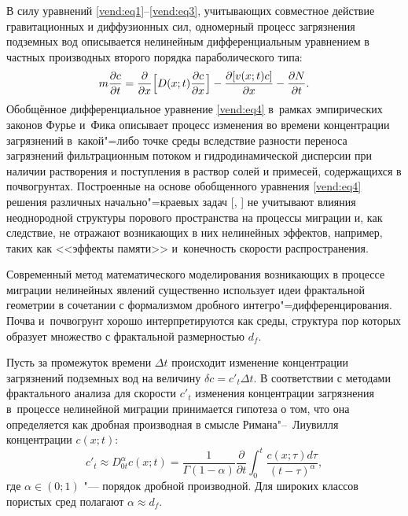 В силу уравнений \eqref{vend:eq1}--\eqref{vend:eq3}, учитывающих совместное действие гравитационных и диффузионных сил,  одномерный процесс загрязнения подземных вод
описывается нелинейным дифференциальным уравнением в частных производных 
второго порядка параболического типа:
\begin{equation}
\label{vend:eq4}
m\frac{\partial c}{\partial t}=\frac{\partial}{\partial x}\Bigl[D(x;t)\frac{\partial c}{\partial x}\Bigr]-\frac{\partial[v(x;t)c]}{\partial x}-\frac{\partial N}{\partial t}.
\end{equation}
Обобщённое дифференциальное уравнение \eqref{vend:eq4} в~рамках   эмпирических законов Фурье и~Фика описывает процесс изменения во времени  концентрации загрязнений в~какой"=либо точке среды вследствие разности 
переноса загрязнений фильтрационным потоком и гидродинамической дисперсии 
при наличии растворения и поступления в раствор солей и примесей, 
содержащихся в почвогрунтах. Построенные на основе обобщенного уравнения 
\eqref{vend:eq4} решения различных начально"=краевых задач [, ] не учитывают влияния 
неоднородной структуры порового пространства на процессы миграции и, как 
следствие, не отражают возникающих в них нелинейных эффектов, например, таких 
как <<эффекты памяти>> и~конечность скорости распространения.

Современный метод математического моделирования возникающих в процессе миграции 
нелинейных явлений существенно 
использует идеи фрактальной геометрии в сочетании с формализмом дробного 
интегро"=диф\-фе\-рен\-ци\-ро\-ва\-ния. Почва и~почвогрунт хорошо интерпретируются как среды, структура пор 
которых образует множество с фрактальной размерностью $d_f$. 

Пусть за промежуток времени $\Delta t$ происходит изменение концентрации 
загрязнений подземных вод на величину 
$\delta c = {c}'_t \Delta t$.
В соответствии с методами фрактального анализа \cite{ven:bib:3} для скорости ${c}'_t $ изменения 
 концентрации загрязнения в~процессе нелинейной миграции 
принимается гипотеза о том, что она определяется как дробная 
производная в смысле Римана"--~Лиувилля концентрации $c(x;t)$:
\begin{equation}
\label{vend:eq5}
{c}'_t\approx D_{0t}^\alpha c(x;t)=\frac{1}{\Gamma(1-\alpha)}\frac{\partial}{\partial t}\int_0^t{\frac{c(x;\tau)d\tau}{(t-\tau)^\alpha}},
\end{equation}
где $\alpha\in(0; 1)$ "--- порядок дробной производной. Для 
широких классов пористых сред полагают $\alpha\approx d_f$.

